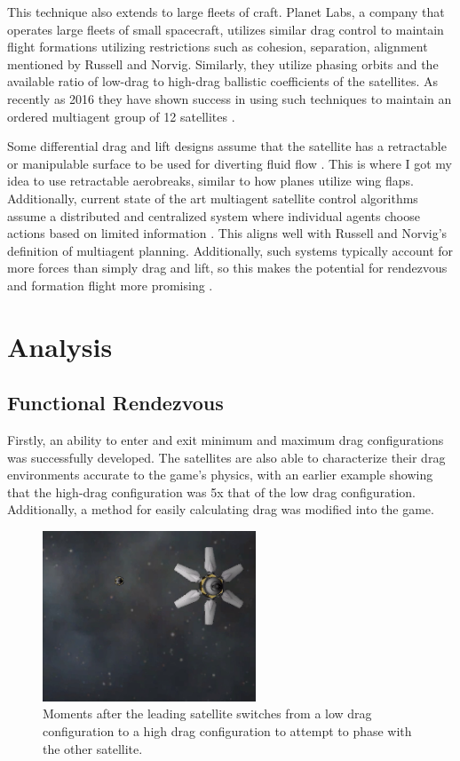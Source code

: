 \documentclass[journal,a4paper,12pt]{IEEEtran}
\begin{document}
This technique also extends to large fleets of craft. Planet Labs, a company that operates
large fleets of small spacecraft, utilizes similar drag control to maintain flight formations
utilizing restrictions such as cohesion, separation, alignment mentioned by Russell and Norvig.
Similarly, they utilize phasing orbits and the available ratio of low-drag to
high-drag ballistic coefficients of the satellites. As recently as 2016 they have shown
success in using such techniques to maintain an ordered multiagent group of 12 satellites \cite{planet_lab}.

Some differential drag and lift designs assume that the satellite has a retractable
or manipulable surface to be used for diverting fluid flow \cite{lift_drag}.
This is where I got my idea to use retractable aerobreaks, similar to how
planes utilize wing flaps. Additionally, current state of the art multiagent satellite
control algorithms assume a distributed and centralized system where individual
agents choose actions based on limited information \cite{dist_boi}. This
aligns well with Russell and Norvig's definition of multiagent planning. Additionally,
such systems typically account for more forces than simply drag and lift, so this
makes the potential for rendezvous and formation flight more promising \cite{dist_boi}.

%
%
\section{Analysis}

\subsection{Functional Rendezvous}
Firstly, an ability to enter and exit minimum and maximum drag configurations was
successfully developed. The satellites are also able to characterize their drag
environments accurate to the game's physics, with an earlier example showing that
the high-drag configuration was 5x that of the low drag configuration. Additionally,
a method for easily calculating drag was modified into the game.

\begin{figure}[h!]
  \centering
  \includegraphics[width=2.5in]{img/draggy}
  \caption{Moments after the leading satellite switches from a low drag configuration
  to a high drag configuration to attempt to phase with the other satellite.}
  \label{drag}
\end{figure}
\end{document}
